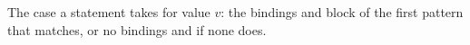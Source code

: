 The case a  statement takes for value $v$: the bindings and block of the first pattern that
matches, or no bindings and  if none does.
